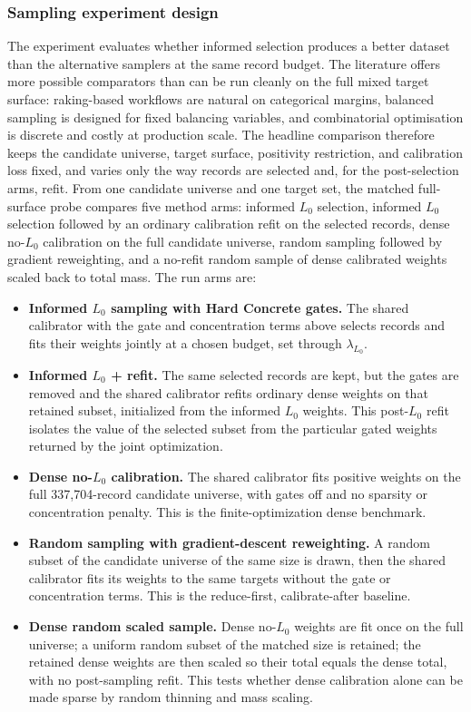 \subsubsection{Sampling experiment design}
\label{sp:sec:experiment_design}

The experiment evaluates whether informed selection produces a better dataset than the alternative
samplers at the same record budget. The literature offers more possible comparators than can be run
cleanly on the full mixed target surface: raking-based workflows are natural on categorical margins,
balanced sampling is designed for fixed balancing variables, and combinatorial optimisation is
discrete and costly at production scale. The headline comparison therefore keeps the candidate
universe, target surface, positivity restriction, and calibration loss fixed, and varies only the way
records are selected and, for the post-selection arms, refit. From one candidate universe and one target
set, the matched full-surface probe compares five method arms: informed $L_0$ selection, informed $L_0$
selection followed by an ordinary calibration refit on the selected records, dense no-$L_0$ calibration on
the full candidate universe, random sampling followed by gradient reweighting, and a no-refit random
sample of dense calibrated weights scaled back to total mass. The run arms are:

\begin{itemize}
    \item \textbf{Informed $L_0$ sampling with Hard Concrete gates.} The shared calibrator with the
    gate and concentration terms above selects records and fits their weights jointly at a chosen
    budget, set through $\lambda_{L_0}$.
    \item \textbf{Informed $L_0$ + refit.} The same selected records are kept, but the gates are removed
    and the shared calibrator refits ordinary dense weights on that retained subset, initialized from the
    informed $L_0$ weights. This post-$L_0$ refit isolates the value of the selected subset from the
    particular gated weights returned by the joint optimization.
    \item \textbf{Dense no-$L_0$ calibration.} The shared calibrator fits positive weights on the full
    337{,}704-record candidate universe, with gates off and no sparsity or concentration penalty. This is
    the finite-optimization dense benchmark.
    \item \textbf{Random sampling with gradient-descent reweighting.} A random subset of the candidate
    universe of the same size is drawn, then the shared calibrator fits its weights to the same targets
    without the gate or concentration terms. This is the reduce-first, calibrate-after baseline.
    \item \textbf{Dense random scaled sample.} Dense no-$L_0$ weights are fit once on the full universe;
    a uniform random subset of the matched size is retained; the retained dense weights are then scaled so
    their total equals the dense total, with no post-sampling refit. This tests whether dense calibration
    alone can be made sparse by random thinning and mass scaling.
\end{itemize}

